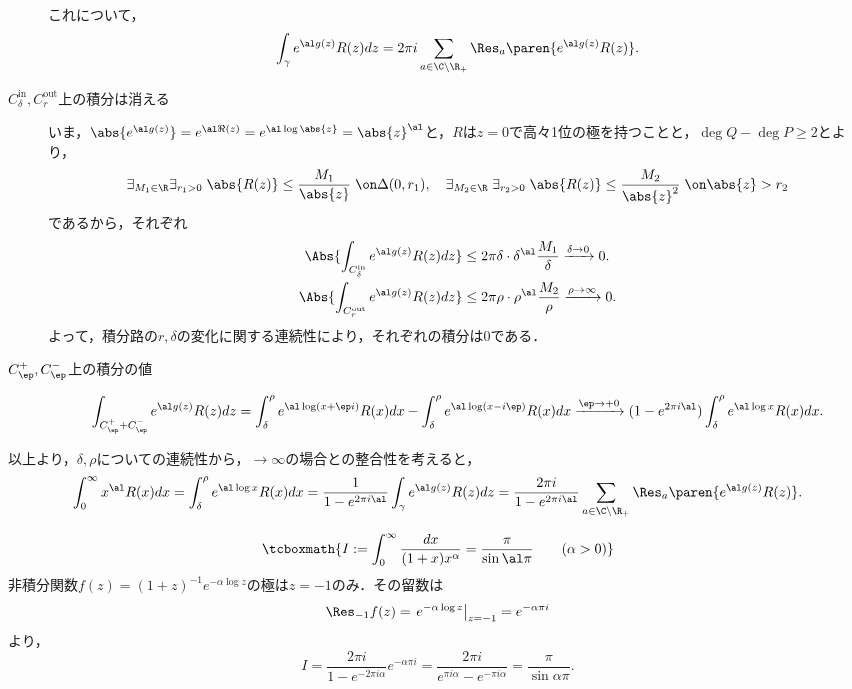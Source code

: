 \documentclass[uplatex, dvipdfmx]{jsreport}
\begin{document}
\begin{Proof}
\begin{description}
\begin{center}
        \end{center}
        これについて，
        \[\int_\gamma e^{\al g(z)}R(z)dz=2\pi i\sum_{a\in\C\setminus\R_+}\Res_a\paren{e^{\al g(z)}R(z)}.\]
        \item[$C_\delta^{\mathrm{in}},C_r^{\mathrm{out}}$上の積分は消える]
        いま，$\abs{e^{\al g(z)}}=e^{\al\Re(z)}=e^{\al\log\abs{z}}=\abs{z}^\al$と，$R$は$z=0$で高々1位の極を持つことと，$\deg Q-\deg P\ge2$とより，
        \[\exists_{M_1\in\R}\exists_{r_1>0}\;\abs{R(z)}\le\frac{M_1}{\abs{z}}\;\on\Delta(0,r_1),\quad\exists_{M_2\in\R}\;\exists_{r_2>0}\;\abs{R(z)}\le\frac{M_2}{\abs{z}^2}\;\on\abs{z}>r_2\]
        であるから，それぞれ
        \begin{align*}
            \Abs{\int_{C_\delta^\mathrm{in}}e^{\al g(z)}R(z)dz}&\le 2\pi\delta\cdot\delta^\al\frac{M_1}{\delta}\xrightarrow{\delta\to0}0.\\
            \Abs{\int_{C_r^\mathrm{out}}e^{\al g(z)}R(z)dz}&\le2\pi\rho\cdot\rho^\al\frac{M_2}{\rho}\xrightarrow{\rho\to\infty}0.
        \end{align*}
        よって，積分路の$r,\delta$の変化に関する連続性により，それぞれの積分は$0$である．
        \item[$C_\ep^+,C_\ep^-$上の積分の値] 
        \[\int_{C^+_\ep+C^-_\ep}e^{\al g(z)}R(z)dz=\int^\rho_\delta e^{\al\log(x+\ep i)}R(x)dx-\int^\rho_\delta e^{\al\log(x-i\ep)}R(x)dx\xrightarrow{\ep\to+0}(1-e^{2\pi i\al})\int^\rho_\delta e^{\al\log x}R(x)dx.\]
    \end{description}
    以上より，$\delta,\rho$についての連続性から，$\to\infty$の場合との整合性を考えると，
    \[\int^\infty_0x^\al R(x)dx=\int^\rho_\delta e^{\al\log x}R(x)dx=\frac{1}{1-e^{2\pi i\al}}\int_\gamma e^{\al g(z)}R(z)dz=\frac{2\pi i}{1-e^{2\pi i\al}}\sum_{a\in\C\setminus\R_+}\Res_a\paren{e^{\al g(z)}R(z)}.\]
\end{Proof}

\begin{example}
    \[\tcboxmath{I:=\int^\infty_0\frac{dx}{(1+x)x^\alpha}=\frac{\pi}{\sin\al\pi}\qquad(\alpha>0)}\]
    非積分関数$f(z)=(1+z)^{-1}e^{-\alpha\log z}$の極は$z=-1$のみ．その留数は
    \[\Res_{-1}f(z)=\left.e^{-\alpha\log z}\right|_{z=-1}=e^{-\alpha\pi i}\]
    より，
    \[I=\frac{2\pi i}{1-e^{-2\pi i\alpha}}e^{-\alpha\pi i}=\frac{2\pi i}{e^{\pi i\alpha}-e^{-\pi i\alpha}}=\frac{\pi}{\sin\alpha\pi}.\]
\end{example}
\end{document}
